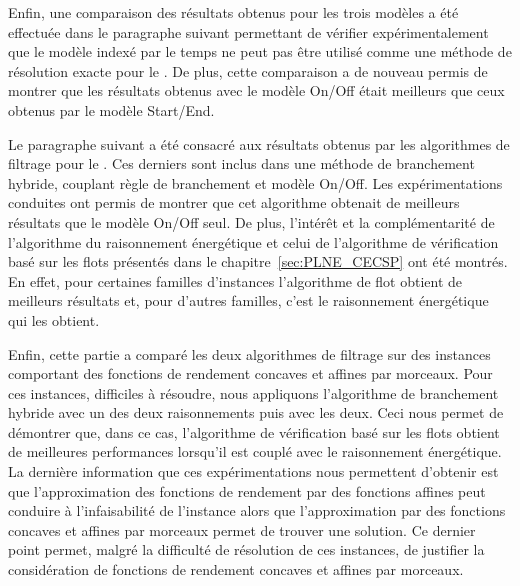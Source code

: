 Enfin, une comparaison des résultats obtenus pour les trois modèles
a été effectuée dans le paragraphe suivant permettant de vérifier
expérimentalement que
le modèle indexé par le temps ne peut pas être utilisé comme une méthode
de résolution exacte pour le \CECSP. De plus, cette comparaison a
de nouveau permis de montrer que les résultats obtenus avec le modèle
On/Off était meilleurs que ceux obtenus par le modèle Start/End. 

Le paragraphe suivant a été consacré aux résultats obtenus par les
algorithmes de filtrage pour le \CECSP. Ces derniers sont inclus dans
une méthode de branchement hybride, couplant règle de branchement et
modèle On/Off. Les expérimentations conduites ont
permis de montrer que cet algorithme obtenait de meilleurs résultats
que le modèle On/Off seul. De plus, l'intérêt et la complémentarité de l'algorithme du
raisonnement énergétique et celui de l'algorithme de vérification basé sur
les flots présentés dans le chapitre~\ref{sec:PLNE_CECSP} ont été montrés. En effet,
pour certaines familles d'instances l'algorithme de flot obtient de
meilleurs résultats et, pour d'autres familles, c'est le raisonnement
énergétique qui les obtient. 

Enfin, cette partie a comparé les deux algorithmes de
filtrage sur des instances comportant des fonctions de rendement
concaves et affines par morceaux. Pour ces instances, difficiles à
résoudre, nous appliquons l'algorithme de branchement hybride avec un
des deux raisonnements puis avec les deux. Ceci nous permet de
démontrer que, dans ce cas, l'algorithme de vérification basé sur les
flots obtient de meilleures performances lorsqu'il est couplé avec le
raisonnement énergétique. La dernière information que ces expérimentations
nous permettent d'obtenir est que l'approximation des fonctions de
rendement par des fonctions affines peut conduire à l'infaisabilité de
l'instance alors que l'approximation par des fonctions concaves et
affines par morceaux permet de trouver une solution. Ce dernier point
permet, malgré la difficulté de résolution de ces instances, de
justifier la considération de fonctions de rendement concaves et
affines par morceaux. 